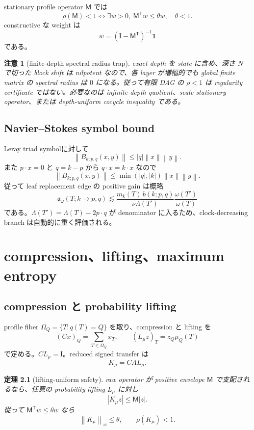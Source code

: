 \documentclass[11pt,a4paper,openany]{book}
\newtheorem{theorem}[definition]{定理}
\newtheorem{remark}[definition]{注意}
\numberwithin{equation}{chapter}
\newcommand{\Id}{\mathrm I}
\newcommand{\norm}[1]{\left\lVert #1\right\rVert}
\begin{document}
stationary profile operator $\mathsf M$ では
\[
\rho(\mathsf M)<1
\Longleftrightarrow
\exists w>0,\ \mathsf M^{\mathsf T}w\le\theta w,
\quad \theta<1.
\]
constructive な weight は
\[
w=(\Id-\mathsf M^{\mathsf T})^{-1}\mathbf1
\]
である。

\begin{remark}[finite-depth spectral radius trap]
exact depth を state に含め、深さ $N$ で切った block shift は nilpotent なので、各 layer が増幅的でも global finite matrix の spectral radius は $0$ になる。従って有限 DAG の $\rho<1$ は regularity certificate ではない。必要なのは infinite-depth quotient、scale-stationary operator、または depth-uniform cocycle inequality である。
\end{remark}

\section{Navier--Stokes symbol bound}
Leray triad symbolに対して
\[
\norm{B_{k;p,q}(x,y)}
\le |q|\norm x\norm y.
\]
また $p\cdot x=0$ と $q=k-p$ から $q\cdot x=k\cdot x$ なので
\[
\norm{B_{k;p,q}(x,y)}
\le \min(|q|,|k|)\norm x\norm y.
\]
従って leaf replacement edge の positive gain は概略
\[
\mathfrak a_\omega(T;k\to p,q)
\lesssim
\frac{m_k(T)\,b(k;p,q)}{\nu\Lambda(T')}
\frac{\omega(T')}{\omega(T)}
\]
である。$\Lambda(T')=\Lambda(T)-2p\cdot q$ が denominator に入るため、clock-decreasing branch は自動的に重く評価される。

\chapter{compression、lifting、maximum entropy}
\section{compression と probability lifting}
profile fiber $\Omega_Q=\{T:q(T)=Q\}$ を取り、compression と lifting を
\[
(Cx)_Q=\sum_{T\in\Omega_Q}x_T,
\qquad
(L_\mu z)_T=z_Q\mu_Q(T)
\]
で定める。$CL_\mu=\Id$。reduced signed transfer は
\[
K_\mu=CAL_\mu.
\]

\begin{theorem}[lifting-uniform safety]
raw operator が positive envelope $\mathsf M$ で支配されるなら、任意の probability lifting $L_\mu$ に対し
\[
|K_\mu z|\le\mathsf M|z|.
\]
従って $\mathsf M^{\mathsf T}w\le\theta w$ なら
\[
\norm{K_\mu}_w\le\theta,
\qquad
\rho(K_\mu)<1.
\]
\end{theorem}
\end{document}
